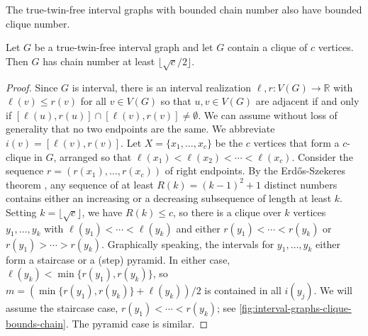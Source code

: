 \documentclass{theoretics}
\newcommand{\bR}{\ensuremath{\mathbb{R}}}
\begin{document}
The true-twin-free interval graphs with bounded chain number also have bounded clique number.
\begin{lemma}
\label{lem:interval-graphs-clique-bounds-chain}
Let $G$ be a true-twin-free interval graph and let $G$ contain a clique of $c$ vertices.
Then $G$ has chain number at least $\lfloor \sqrt c/2\rfloor$.
\end{lemma}
\begin{proof}
Since $G$ is interval, there is an interval realization $\ell, r : V(G) \to \bR$ with $\ell(v)\le r(v)$
for all $v\in V(G)$ so that $u,v\in V(G)$ are adjacent if and only if
$[\ell(u),r(u)]\cap[\ell(v),r(v)] \ne \emptyset$.  We can assume without loss of generality
that no two endpoints are the same. We abbreviate $i(v)= [\ell(v),r(v)]$.
	Let $X = \{x_1,\ldots,x_c\}$ be the $c$ vertices that form a $c$-clique in $G$,
	arranged so that $\ell(x_1)< \ell(x_2)<\cdots< \ell(x_c)$.
	Consider the sequence $r = (r(x_1),\ldots,r(x_c))$ of right endpoints.
	By the Erd{\H
o}s-Szekeres theorem \cite{ES35}, any sequence of at least $R(k) = (k-1)^2 + 1$ distinct numbers contains 
	either an increasing or a decreasing subsequence of length at least $k$.
	Setting $k=\lfloor \sqrt c\rfloor$, we have $R(k) \le c$,
	so there is a clique over $k$ vertices $y_1,\ldots,y_k$ with $\ell(y_1)<\cdots<\ell(y_k)$
	and either $r(y_1)<\cdots<r(y_k)$ or $r(y_1)>\cdots>r(y_k)$.
	Graphically speaking, the intervals for $y_1,\ldots,y_k$ either form a staircase or a (step) pyramid.
	In either case, $\ell(y_k) < \min\{r(y_1),r(y_k)\}$, so
	$m = (\min\{r(y_1),r(y_k)\} + \ell(y_k))/2$ is contained in all $i(y_j)$.
	We will assume the staircase case, $r(y_1)<\cdots<r(y_k)$; 
	see \cref{fig:interval-graphs-clique-bounds-chain}. 
	The pyramid case is similar.
	

\end{proof}
\end{document}
